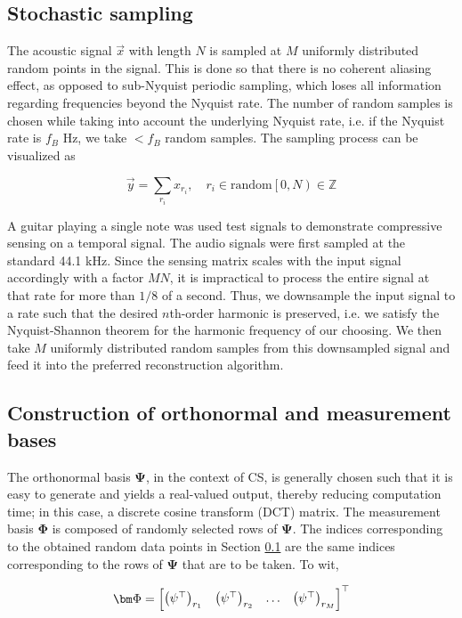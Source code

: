 \documentclass[10pt,a4paper,twoside]{article}
\begin{document}
\subsection{Stochastic sampling}\label{ssec:subsample}
The acoustic signal $\vec{x}$ with length $N$ is sampled at $M$ uniformly distributed random points in the signal. This is done so that there is no coherent aliasing effect, as opposed to sub-Nyquist periodic sampling, which loses all information regarding frequencies beyond the Nyquist rate. The number of random samples is chosen while taking into account the underlying Nyquist rate, i.e. if the Nyquist rate is $f_B$ Hz, we take $< f_B$ random samples. The sampling process can be visualized as

\begin{equation}\label{eq:randomsample}
	\vec{y} = \sum_{r_i} x_{r_i}, \quad r_i \in \textrm{random}\left[ 0, N \right) \in \mathbb{Z}
\end{equation}

A guitar playing a single note was used test signals to demonstrate compressive sensing on a temporal signal. The audio signals were first sampled at the standard 44.1 kHz. Since the sensing matrix scales with the input signal accordingly with a factor $MN$, it is impractical to process the entire signal at that rate for more than $1/8$ of a second. Thus, we downsample the input signal to a rate such that the desired $n$th-order harmonic is preserved, i.e. we satisfy the Nyquist-Shannon theorem for the harmonic frequency of our choosing. We then take $M$ uniformly distributed random samples from this downsampled signal and feed it into the preferred reconstruction algorithm.

\subsection{Construction of orthonormal and measurement bases}\label{ssec:bases}
The orthonormal basis $\bm\Psi$, in the context of CS, is generally chosen such that it is easy to generate and yields a real-valued output, thereby reducing computation time; in this case, a discrete cosine transform (DCT) matrix. The measurement basis $\bm\Phi$ is composed of randomly selected rows of $\bm\Psi$. The indices corresponding to the obtained random data points in Section \ref{ssec:subsample} are the same indices corresponding to the rows of $\bm\Psi$ that are to be taken. To wit,

\begin{equation}\label{eq:constructbasis}
	\bm\Phi = \mqty[ \qty(\psi^\top)_{r_1} & \qty(\psi^\top)_{r_2} & \hdots  & \qty(\psi^\top)_{r_M} ]^\top
\end{equation}
\end{document}
